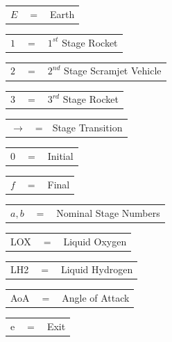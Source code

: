 \newline
\begin{tabular}{p{0.8cm}p{0.8cm}p{5.6cm}}
	$E$ & $=$ & Earth\\
	
\end{tabular} 
\begin{tabular}{p{0.8cm}p{0.8cm}p{5.6cm}}
	$1$ & $=$ & $1^{st}$ Stage Rocket\\
\end{tabular} 
\begin{tabular}{p{0.8cm}p{0.8cm}p{5.6cm}}
	$2$ & $=$ & $2^{nd}$ Stage Scramjet Vehicle\\
\end{tabular} 
\begin{tabular}{p{0.8cm}p{0.8cm}p{5.6cm}}
	$3$ & $=$ & $3^{rd}$ Stage Rocket\\
\end{tabular} 
\begin{tabular}{p{0.8cm}p{0.8cm}p{5.6cm}}
	$\rightarrow$ & = & Stage Transition\\
\end{tabular} 
\begin{tabular}{p{0.8cm}p{0.8cm}p{5.6cm}}
	$0$ & $=$ & Initial\\
\end{tabular} 
\begin{tabular}{p{0.8cm}p{0.8cm}p{5.6cm}}
	$f$ & $=$ & Final\\
\end{tabular} 
\begin{tabular}{p{0.8cm}p{0.8cm}p{5.6cm}}
	$a,b$ & $=$ & Nominal Stage Numbers\\
\end{tabular} 
\begin{tabular}{p{0.8cm}p{0.8cm}p{5.6cm}}
	LOX & $=$ & Liquid Oxygen\\
\end{tabular} 
\begin{tabular}{p{0.8cm}p{0.8cm}p{5.6cm}}
	LH2 & $=$ & Liquid Hydrogen\\
	
\end{tabular} 
\begin{tabular}{p{0.8cm}p{0.8cm}p{5.6cm}}
	AoA & $=$ & Angle of Attack\\
	
\end{tabular} 
\begin{tabular}{p{0.8cm}p{0.8cm}p{5.6cm}}
	e & $=$ & Exit\\
\end{tabular} 
